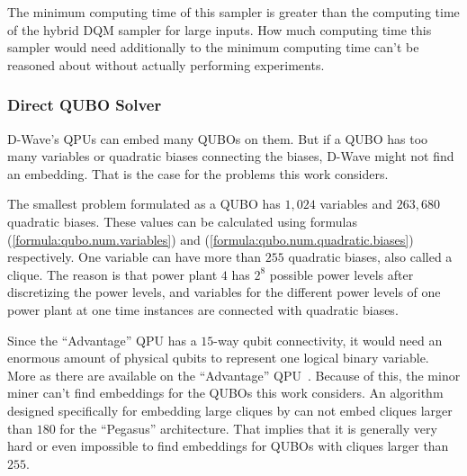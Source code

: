 The minimum computing time of this sampler is greater than the computing time of the hybrid DQM sampler for large inputs.
How much computing time this sampler would need additionally to the minimum computing time can't be reasoned about without actually performing experiments.

\subsubsection{Direct QUBO Solver}

D-Wave's QPUs can embed many QUBOs on them.
But if a QUBO has too many variables or quadratic biases connecting the biases, D-Wave might not find an embedding.
That is the case for the problems this work considers.

The smallest problem formulated as a QUBO has $1, 024$ variables and $263, 680$ quadratic biases.
These values can be calculated using formulas (\ref{formula:qubo.num.variables}) and (\ref{formula:qubo.num.quadratic.biases}) respectively.
One variable can have more than $255$ quadratic biases, also called a clique.
The reason is that power plant $4$ has $2^8$ possible power levels after discretizing the power levels, and variables for the different power levels of one power plant at one time instances are connected with quadratic biases.

Since the ``Advantage'' QPU has a $15$-way qubit connectivity, it would need an enormous amount of physical qubits to represent one logical binary variable.
More as there are available on the ``Advantage'' QPU~\cite{D-Wave2020, Zbinden2020}.
Because of this, the minor miner can't find embeddings for the QUBOs this work considers.
An algorithm designed specifically for embedding large cliques by \citeauthor{Zbinden2020} can not embed cliques larger than $180$ for the ``Pegasus'' architecture.
That implies that it is generally very hard or even impossible to find embeddings for QUBOs with cliques larger than $255$.
